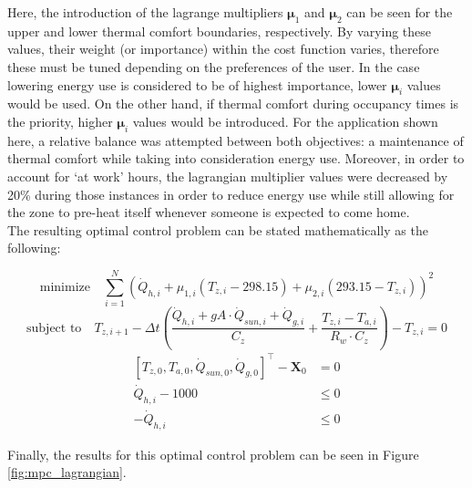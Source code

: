 Here, the introduction of the lagrange multipliers $\boldsymbol{\mu}_1$ and $\boldsymbol{\mu}_2$ can be seen for the upper and lower thermal comfort boundaries, respectively. By varying these values, their weight (or importance) within the cost function varies, therefore these must be tuned depending on the preferences of the user. In the case lowering energy use is considered to be of highest importance, lower $\boldsymbol{\mu}_i$ values would be used. On the other hand, if thermal comfort during occupancy times is the priority, higher $\boldsymbol{\mu}_i$ values would be introduced. For the application shown here, a relative balance was attempted between both objectives: a maintenance of thermal comfort while taking into consideration energy use. Moreover, in order to account for `at work' hours, the lagrangian multiplier values were decreased by 20\% during those instances in order to reduce energy use while still allowing for the zone to pre-heat itself whenever someone is expected to come home.\\

The resulting optimal control problem can be stated mathematically as the following:

\begin{equation}
{\text{minimize}} \hspace{1em} \sum_{i=1}^{N} \left(\dot{Q}_{h,i} + \mu_{1,i}\left(T_{z,i} - 298.15\right) + \mu_{2,i}\left(293.15 - T_{z,i}\right)\right)^2
\label{eq:mpclag1}
\end{equation}
\begin{equation}
\text{subject to}  \hspace{1em} T_{z,i+1} - \Delta t \left( \frac{\dot{Q}_{h,i} + gA \cdot \dot{Q}_{sun, i} + \dot{Q}_{g,i}}{C_z} + \frac{T_{z,i}-T_{a,i}}{R_w \cdot C_z} \right) - T_{z,i} =0
\end{equation}
\vspace{-0.5em}
\begin{align}
\left[T_{z,0}, T_{a,0}, \dot{Q}_{sun,0}, \dot{Q}_{g,0}\right]^{\top}  - \boldsymbol{X}_0 &=  0 \\[0.5em]
\dot{Q}_{h,i} - 1000 &\leq 0\\[0.5em]
-\dot{Q}_{h,i} &\leq 0
\label{eq:mpclag2}
\end{align}

Finally, the results for this optimal control problem can be seen in Figure \ref{fig:mpc_lagrangian}.

